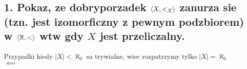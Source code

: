 \documentclass{article}
\begin{document}
\ttfamily
\subsection*{1. Pokaz, ze dobryporzadek $\langle X,<_X\rangle$ zanurza sie (tzn. jest izomorficzny z pewnym podzbiorem) w $\langle \mathbb{R},<\rangle$ wtw gdy $X$ jest przeliczalny.}

Przypadki kiedy $|X|<\aleph_0$ sa trywialne, wiec rozpatrzymy tylko $|X|=\aleph_0$\bigskip\\
$\impliedby$\medskip\\
\end{document}
